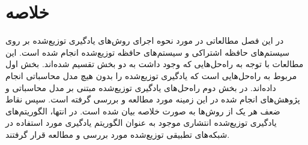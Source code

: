 \section{خلاصه}
در این فصل مطالعاتی در مورد نحوه اجرای روش‌های یادگیری توزیع‌شده بر روی سیستم‌های حافظه اشتراکی و سیستم‌های حافظه توزیع‌شده انجام شده است. این مطالعات با توجه به راه‌حل‌هایی که وجود داشت به دو بخش تقسیم شده‌اند. بخش اول مربوط به راه‌حل‌هایی است که یادگیری توزیع‌شده را بدون هیچ مدل محاسباتی انجام داده‌اند. در بخش دوم راه‌حل‌های یادگیری توزیع‌شده مبتنی بر مدل محاسباتی و پژوهش‌های انجام شده در این زمینه مورد مطالعه و بررسی گرفته است. سپس نقاط ضعف هر یک از روش‌ها به صورت خلاصه بیان شده است. در انتها، الگوریتم‌های یادگیری توزیع‌شده انتشاری موجود به عنوان الگوریتم یادگیری مورد استفاده در شبکه‌های تطبیقی توزیع‌شده مورد بررسی و مطالعه قرار گرفتند. 




